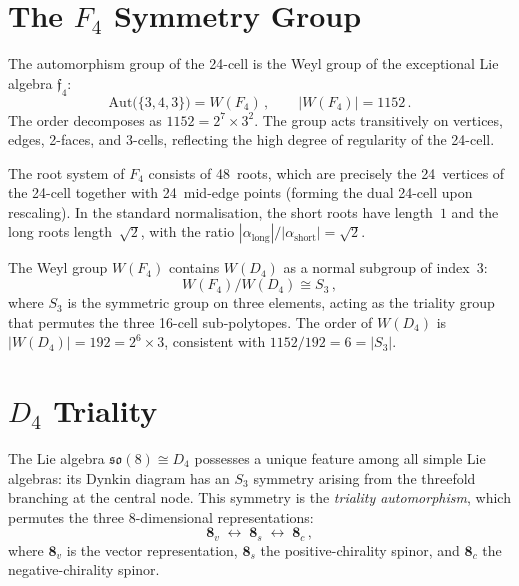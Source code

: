 \documentclass[amsmath,amssymb,aps,prd,twocolumn,superscriptaddress,nofootinbib]{revtex4-2}
\begin{document}
\section{The $F_4$ Symmetry Group}\label{sec:F4}

The automorphism group of the 24-cell is the Weyl group of the exceptional Lie
algebra $\mathfrak{f}_4$:
\begin{equation}\label{eq:WF4}
  \mathrm{Aut}\bigl(\{3,4,3\}\bigr) = W(F_4)\,,
  \qquad |W(F_4)| = 1152\,.
\end{equation}
The order decomposes as $1152 = 2^7 \times 3^2$.  The group acts transitively
on vertices, edges, 2-faces, and 3-cells, reflecting the high degree of
regularity of the 24-cell.

The root system of $F_4$ consists of 48~roots, which are precisely the
24~vertices of the 24-cell together with 24~mid-edge points (forming the dual
24-cell upon rescaling).  In the standard normalisation, the short roots have
length~$1$ and the long roots length~$\sqrt{2}$, with the ratio
$|\alpha_{\text{long}}|/|\alpha_{\text{short}}| = \sqrt{2}$.

The Weyl group $W(F_4)$ contains $W(D_4)$ as a normal subgroup of index~3:
\begin{equation}\label{eq:quotient}
  W(F_4) / W(D_4) \cong S_3\,,
\end{equation}
where $S_3$ is the symmetric group on three elements, acting as the triality
group that permutes the three 16-cell sub-polytopes.  The order of $W(D_4)$ is
$|W(D_4)| = 192 = 2^6 \times 3$, consistent with $1152/192 = 6 = |S_3|$.

\section{$D_4$ Triality}\label{sec:triality}

The Lie algebra $\mathfrak{so}(8) \cong D_4$ possesses a unique feature among
all simple Lie algebras: its Dynkin diagram has an $S_3$ symmetry arising from
the threefold branching at the central node.  This symmetry is the \emph{triality
automorphism}, which permutes the three 8-dimensional representations:
\begin{equation}\label{eq:triality}
  \mathbf{8}_v \;\longleftrightarrow\; \mathbf{8}_s
  \;\longleftrightarrow\; \mathbf{8}_c\,,
\end{equation}
where $\mathbf{8}_v$ is the vector representation, $\mathbf{8}_s$ the
positive-chirality spinor, and $\mathbf{8}_c$ the negative-chirality spinor.
\end{document}

